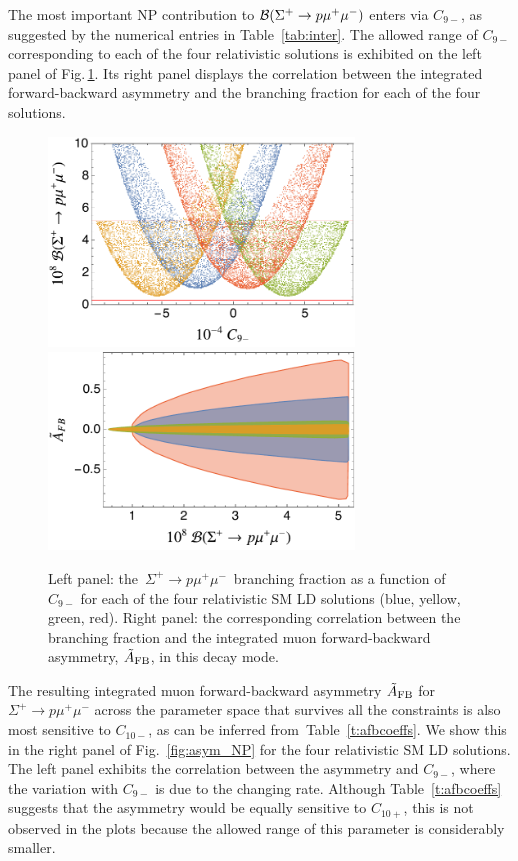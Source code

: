 \documentclass[amsmath,amssymb,aps,nofootinbib,prd,preprint,superscriptaddress,tightenlines,a4paper,bm]{revtex4-2}
\begin{document}
The most important NP contribution to ${\cal B}(\Sigma^+ \to p \mu^+\mu^-)$ enters via $C_{9-}$, as suggested by the numerical entries in Table~\ref{tab:inter}.
The allowed range of $C_{9-}$ corresponding to each of the four relativistic solutions is exhibited on the left panel of Fig.\,\ref{f:sigmacon}.
Its right panel displays the correlation between the  integrated forward-backward asymmetry and the branching fraction for each of the four solutions.

\begin{figure}[t] \bigskip
\includegraphics[width=3.2in]{bsigc9.pdf} ~ ~ \includegraphics[width=3.2in]{afbtbr.pdf} \vspace{-1ex}
\caption{Left panel: the \,$\Sigma^+ \to p \mu^+\mu^-$\, branching fraction as a function of $C_{9-}$ for each of the four relativistic SM LD solutions (blue, yellow, green, red).
Right panel: the corresponding correlation between the branching fraction and the integrated muon forward-backward asymmetry, $\tilde{A}_{\rm FB}$, in this decay mode.}
    \label{f:sigmacon}
\end{figure}

The resulting integrated muon forward-backward asymmetry $\tilde A_{\rm FB}$ for $\Sigma^+\to p \mu^+\mu^-$ across the parameter space that survives all the constraints is also most sensitive to $C_{10-}$, as can be inferred from~Table~\ref{t:afbcoeffs}.
We show this in the right panel of Fig.~\ref{fig:asym_NP} for the four relativistic SM LD solutions.
The left panel exhibits the correlation between the asymmetry and $C_{9-}$, where the variation with $C_{9-}$ is due to the changing rate.
Although Table~\ref{t:afbcoeffs} suggests that the asymmetry would be equally sensitive to $C_{10+}$, this is not observed in the plots because the allowed range of this parameter is considerably smaller.
\end{document}
